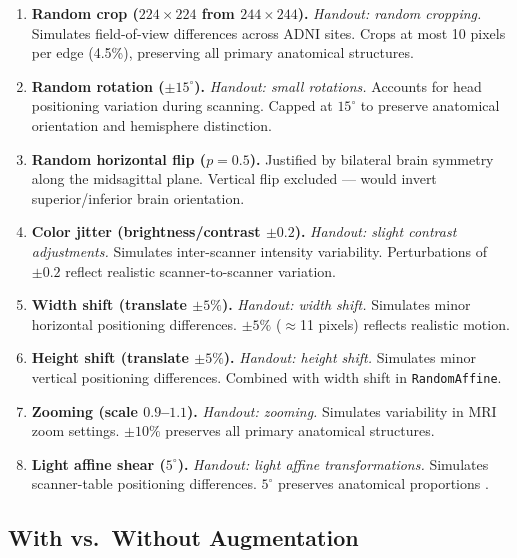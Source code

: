 \documentclass[12pt, a4paper]{article}
\begin{document}
\begin{enumerate}
    \item \textbf{Random crop ($224\times224$ from
    $244\times244$).} \textit{Handout: random cropping.}
    Simulates field-of-view differences across ADNI
    sites. Crops at most 10 pixels per edge (4.5\%),
    preserving all primary anatomical structures.

    \item \textbf{Random rotation ($\pm15^\circ$).}
    \textit{Handout: small rotations.}
    Accounts for head positioning variation during
    scanning. Capped at $15^\circ$ to preserve
    anatomical orientation and hemisphere distinction.

    \item \textbf{Random horizontal flip ($p=0.5$).}
    Justified by bilateral brain symmetry along the
    midsagittal plane. Vertical flip excluded --- would
    invert superior/inferior brain orientation.

    \item \textbf{Color jitter (brightness/contrast
    $\pm0.2$).} \textit{Handout: slight contrast
    adjustments.} Simulates inter-scanner intensity
    variability. Perturbations of $\pm0.2$ reflect
    realistic scanner-to-scanner variation.

    \item \textbf{Width shift (translate $\pm5\%$).}
    \textit{Handout: width shift.} Simulates minor
    horizontal positioning differences. $\pm5\%$
    ($\approx$11 pixels) reflects realistic motion.

    \item \textbf{Height shift (translate $\pm5\%$).}
    \textit{Handout: height shift.} Simulates minor
    vertical positioning differences. Combined with
    width shift in \texttt{RandomAffine}.

    \item \textbf{Zooming (scale $0.9$--$1.1$).}
    \textit{Handout: zooming.} Simulates variability in
    MRI zoom settings. $\pm10\%$ preserves all primary
    anatomical structures.

    \item \textbf{Light affine shear ($5^\circ$).}
    \textit{Handout: light affine transformations.}
    Simulates scanner-table positioning differences.
    $5^\circ$ preserves anatomical proportions
    \cite{lim2022}.
\end{enumerate}

\subsection{With vs.\ Without Augmentation}
\end{document}
